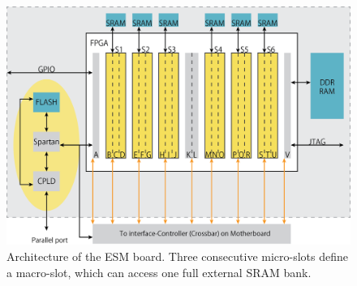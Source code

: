 \begin{figure}[htb]%
\includegraphics[width=\columnwidth]{Pictures/erlangen}%
\caption{Architecture of the ESM board. Three consecutive micro-slots define a macro-slot, which can access one full external SRAM bank.}%
\label{fig:erlangen}%
\end{figure}
